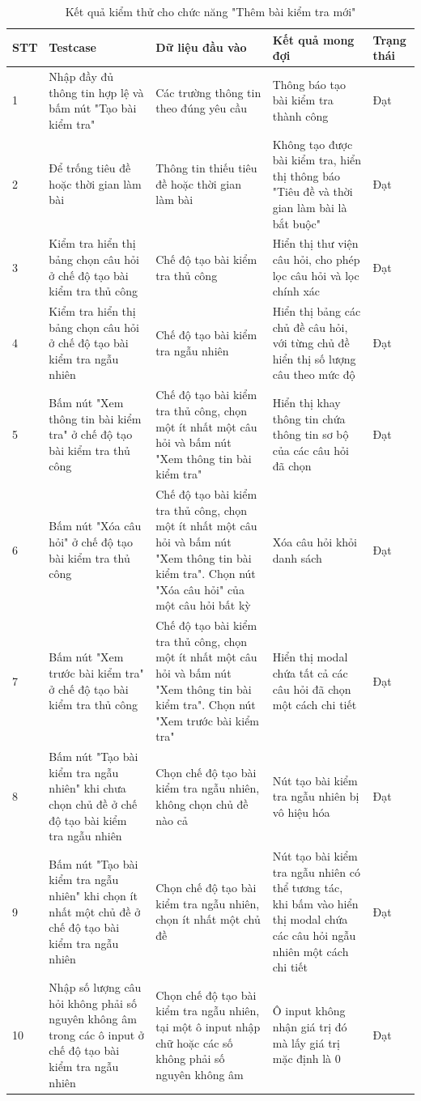 \documentclass[../DoAn.tex]{subfiles}
\begin{document}
\begin{longtable}{|p{}|p{}|p{}|p{}|p{}|}
\caption{Kết quả kiểm thử cho chức năng "Thêm bài kiểm tra mới"}
\hline
\textbf{STT} & \textbf{Testcase} & \textbf{Dữ liệu đầu vào} & \textbf{Kết quả mong đợi} & \textbf{Trạng thái} \\ \hline
1 & Nhập đầy đủ thông tin hợp lệ và bấm nút "Tạo bài kiểm tra" & Các trường thông tin theo đúng yêu cầu & Thông báo tạo bài kiểm tra thành công & Đạt \\ \hline
2 & Để trống tiêu đề hoặc thời gian làm bài & Thông tin thiếu tiêu đề hoặc thời gian làm bài & Không tạo được bài kiểm tra, hiển thị thông báo "Tiêu đề và thời gian làm bài là bắt buộc" & Đạt \\ \hline
3 & Kiểm tra hiển thị bảng chọn câu hỏi ở chế độ tạo bài kiểm tra thủ công & Chế độ tạo bài kiểm tra thủ công & Hiển thị thư viện câu hỏi, cho phép lọc câu hỏi và lọc chính xác & Đạt \\ \hline
4 & Kiểm tra hiển thị bảng chọn câu hỏi ở chế độ tạo bài kiểm tra ngẫu nhiên & Chế độ tạo bài kiểm tra ngẫu nhiên & Hiển thị bảng các chủ đề câu hỏi, với từng chủ đề hiển thị số lượng câu theo mức độ & Đạt \\ \hline
5 & Bấm nút "Xem thông tin bài kiểm tra" ở chế độ tạo bài kiểm tra thủ công  & Chế độ tạo bài kiểm tra thủ công, chọn một ít nhất một câu hỏi và bấm nút "Xem thông tin bài kiểm tra" & Hiển thị khay thông tin chứa thông tin sơ bộ của các câu hỏi đã chọn & Đạt \\ \hline
6 & Bấm nút "Xóa câu hỏi" ở chế độ tạo bài kiểm tra thủ công & Chế độ tạo bài kiểm tra thủ công, chọn một ít nhất một câu hỏi và bấm nút "Xem thông tin bài kiểm tra". Chọn nút "Xóa câu hỏi" của một câu hỏi bất kỳ & Xóa câu hỏi khỏi danh sách & Đạt \\ \hline
7 & Bấm nút "Xem trước bài kiểm tra" ở chế độ tạo bài kiểm tra thủ công & Chế độ tạo bài kiểm tra thủ công, chọn một ít nhất một câu hỏi và bấm nút "Xem thông tin bài kiểm tra". Chọn nút "Xem trước bài kiểm tra" & Hiển thị modal chứa tất cả các câu hỏi đã chọn một cách chi tiết & Đạt \\ \hline
8 & Bấm nút "Tạo bài kiểm tra ngẫu nhiên" khi chưa chọn chủ đề ở chế độ tạo bài kiểm tra ngẫu nhiên & Chọn chế độ tạo bài kiểm tra ngẫu nhiên, không chọn chủ đề nào cả & Nút tạo bài kiểm tra ngẫu nhiên bị vô hiệu hóa & Đạt \\ \hline
9 & Bấm nút "Tạo bài kiểm tra ngẫu nhiên" khi chọn ít nhất một chủ đề ở chế độ tạo bài kiểm tra ngẫu nhiên & Chọn chế độ tạo bài kiểm tra ngẫu nhiên, chọn ít nhất một chủ đề & Nút tạo bài kiểm tra ngẫu nhiên có thể tương tác, khi bấm vào hiển thị modal chứa các câu hỏi ngẫu nhiên một cách chi tiết & Đạt \\ \hline
10 & Nhập số lượng câu hỏi không phải số nguyên không âm trong các ô input ở chế độ tạo bài kiểm tra ngẫu nhiên & Chọn chế độ tạo bài kiểm tra ngẫu nhiên, tại một ô input nhập chữ hoặc các số không phải số nguyên không âm & Ô input không nhận giá trị đó mà lấy giá trị mặc định là 0 & Đạt \\ \hline
\end{longtable}
\end{document}
